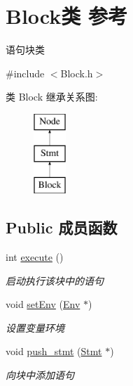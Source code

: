 \hypertarget{class_block}{}\section{Block类 参考}
\label{class_block}


语句块类  




{\ttfamily \#include $<$Block.\+h$>$}

类 Block 继承关系图\+:\begin{figure}[H]
\begin{center}
\leavevmode
\includegraphics[height=3.000000cm]{class_block}
\end{center}
\end{figure}
\subsection*{Public 成员函数}
\begin{DoxyCompactItemize}
\item 
\mbox{\label{class_block_a8e03f15df4e43cd6c802341c3bda6b33}} 
int \hyperlink{class_block_a8e03f15df4e43cd6c802341c3bda6b33}{execute} ()
\begin{DoxyCompactList}\small\item\em 启动执行该块中的语句 \end{DoxyCompactList}\item 
\mbox{\label{class_block_aa48058bd426766898bf31df828b3dac2}} 
void \hyperlink{class_block_aa48058bd426766898bf31df828b3dac2}{set\+Env} (\hyperlink{class_env}{Env} $\ast$)
\begin{DoxyCompactList}\small\item\em 设置变量环境 \end{DoxyCompactList}\item 
\mbox{\label{class_block_acd012454c035cc7e0d508365752221ff}} 
void \hyperlink{class_block_acd012454c035cc7e0d508365752221ff}{push\+\_\+stmt} (\hyperlink{class_stmt}{Stmt} $\ast$)
\begin{DoxyCompactList}\small\item\em 向块中添加语句 \end{DoxyCompactList}\end{DoxyCompactItemize}
